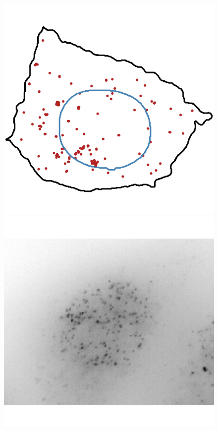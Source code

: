 \begin{figure}[]
		\includegraphics[width=0.95\linewidth]{figures/introduction/real_coord_foci}
	\endminipage\hfill
		\includegraphics[width=0.95\linewidth]{figures/introduction/real_image_intranuclear}
		\vfill

\end{figure}

